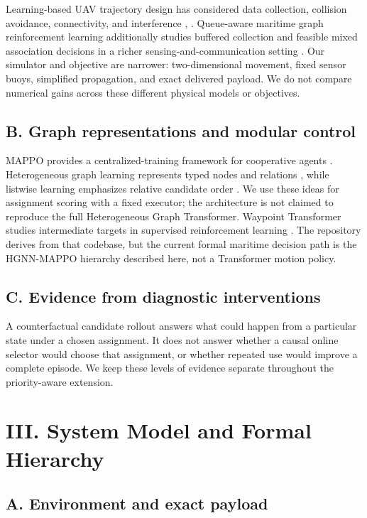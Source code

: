 Learning-based UAV trajectory design has considered data collection, collision avoidance, connectivity, and interference \cite{xu2022}, \cite{wang2022}. Queue-aware maritime graph reinforcement learning additionally studies buffered collection and feasible mixed association decisions in a richer sensing-and-communication setting \cite{li2026}. Our simulator and objective are narrower: two-dimensional movement, fixed sensor buoys, simplified propagation, and exact delivered payload. We do not compare numerical gains across these different physical models or objectives.

\subsection*{B. Graph representations and modular control}

MAPPO provides a centralized-training framework for cooperative agents \cite{yu2022}. Heterogeneous graph learning represents typed nodes and relations \cite{hu2020}, while listwise learning emphasizes relative candidate order \cite{cao2007}. We use these ideas for assignment scoring with a fixed executor; the architecture is not claimed to reproduce the full Heterogeneous Graph Transformer. Waypoint Transformer studies intermediate targets in supervised reinforcement learning \cite{badrinath2023}. The repository derives from that codebase, but the current formal maritime decision path is the HGNN-MAPPO hierarchy described here, not a Transformer motion policy.

\subsection*{C. Evidence from diagnostic interventions}

A counterfactual candidate rollout answers what could happen from a particular state under a chosen assignment. It does not answer whether a causal online selector would choose that assignment, or whether repeated use would improve a complete episode. We keep these levels of evidence separate throughout the priority-aware extension.

\section*{III. System Model and Formal Hierarchy}

\subsection*{A. Environment and exact payload}

